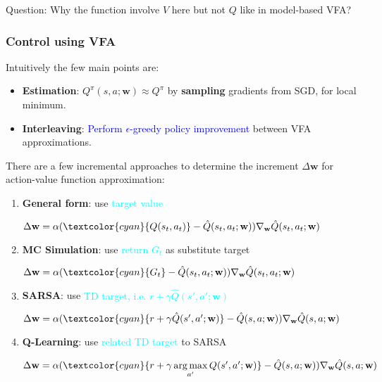 \documentclass{article}
\begin{document}
\begin{hintbox}
    Question: Why the function involve $V$ here but not $Q$ like in model-based VFA?
\end{hintbox}

\subsubsection{Control using VFA}
Intuitively the few main points are:
\begin{itemize}
\item \textbf{Estimation}: $Q^{\pi}(s, a; \mathbf{w}) \approx Q^{\pi}$ by \textbf{sampling} gradients from SGD, for local minimum. 
\item \textbf{Interleaving}: \textcolor{blue}{Perform $\epsilon$-greedy policy improvement} between VFA approximations.
\end{itemize}

There are a few incremental approaches to determine the increment $\Delta \mathbf{w}$ for action-value function approximation:
\begin{enumerate}
\item \textbf{General form}: use \textcolor{cyan}{target value} 
    \begin{center}
        $\Delta \mathbf{w} = \alpha( \textcolor{cyan}{Q(s_t, a_t)} - \hat{Q}(s_t, a_t; \mathbf{w}) ) \nabla_{\mathbf{w}} \hat{Q}(s_t, a_t; \mathbf{w})$ 
    \end{center}
\item \textbf{MC Simulation}: use \textcolor{cyan}{return $G_t$} as substitute target
    \begin{center}
        $\Delta \mathbf{w} = \alpha( \textcolor{cyan}{G_t} - \hat{Q}(s_t, a_t; \mathbf{w}) ) \nabla_{\mathbf{w}} \hat{Q}(s_t, a_t; \mathbf{w})$ 
    \end{center}
\item \textbf{SARSA}: use \textcolor{cyan}{TD target, i.e. $r + \gamma \hat{Q}(s', a'; \mathbf{w})$} 
    \begin{center}
        $\Delta \mathbf{w} = \alpha( \textcolor{cyan}{r + \gamma \hat{Q}(s', a'; \mathbf{w})} - \hat{Q}(s, a; \mathbf{w}) ) \nabla_{\mathbf{w}} \hat{Q}(s, a; \mathbf{w})$ 
    \end{center}
\item \textbf{Q-Learning}: use \textcolor{cyan}{related TD target} to SARSA
    \begin{center}
        $\Delta \mathbf{w} = \alpha( \textcolor{cyan}{
            r + \gamma \mathop{\arg\max}\limits_{a'} Q(s', a'; \mathbf{w})
        } - \hat{Q}(s, a; \mathbf{w}) ) \nabla_{\mathbf{w}} \hat{Q}(s, a; \mathbf{w})$ 
    \end{center}
\end{enumerate}
\end{document}
